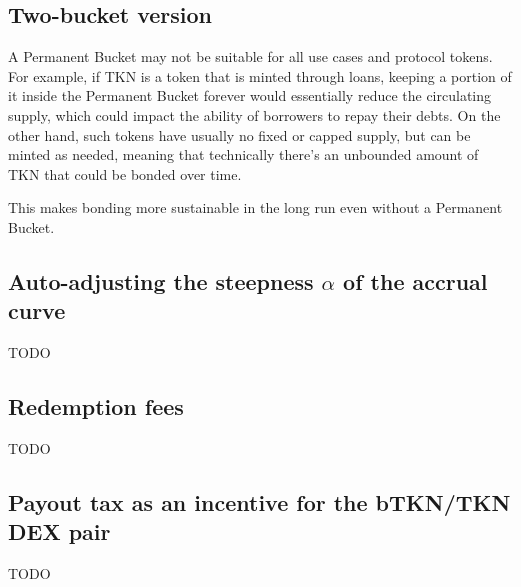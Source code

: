 \documentclass{article}
\begin{document}
\subsection{Two-bucket version}
\label{sec:two-bucket}
A Permanent Bucket may not be suitable for all use cases and protocol tokens. For example, if TKN is a token that is minted through loans, keeping a portion of it inside the Permanent Bucket forever would essentially reduce the circulating supply, which could impact the ability of borrowers to repay their debts. On the other hand, such tokens have usually no fixed or capped supply, but can be minted as needed, meaning that technically there's an unbounded amount of TKN that could be bonded over time.

This makes bonding more sustainable in the long run even without a Permanent Bucket.


\subsection{Auto-adjusting the steepness $\alpha$ of the accrual curve}
  \label{sec:adjustment}
TODO

\subsection{Redemption fees}
  \label{sec:redemption-fee}
TODO

\subsection{Payout tax as an incentive for the bTKN/TKN DEX pair}
  \label{sec:payout-tax}
TODO
\end{document}
